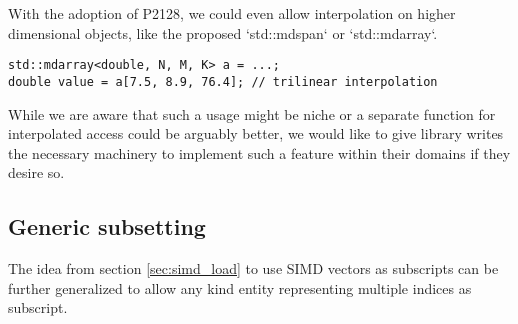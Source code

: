 With the adoption of P2128, we could even allow interpolation on higher dimensional objects, like the proposed `std::mdspan` or `std::mdarray`.
\smallskip\begin{lstlisting}
std::mdarray<double, N, M, K> a = ...;
double value = a[7.5, 8.9, 76.4]; // trilinear interpolation
\end{lstlisting}

While we are aware that such a usage might be niche or a separate function for interpolated access could be arguably better, we would like to give library writes the necessary machinery to implement such a feature within their domains if they desire so.

\subsection{Generic subsetting}
The idea from section \ref{sec:simd_load} to use SIMD vectors as subscripts can be further generalized to allow any kind entity representing multiple indices as subscript.
